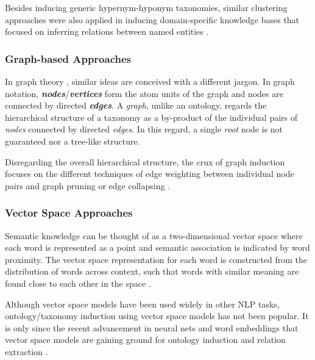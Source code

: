 Besides inducing generic hypernym-hyponym taxonomies, similar clustering approaches were also applied in inducing domain-specific knowledge bases that focused on inferring relations between named entities \citep[e.g.][]{hasegawa2004discovering}.


\subsubsection{Graph-based Approaches}

In graph theory \citep{biggs1976graph}, similar ideas are conceived with a different jargon. In graph notation, \emph{\textbf{nodes}}/\emph{\textbf{vertices}} form the atom units of the graph and nodes are connected by directed \emph{\textbf{edges}}. A \emph{graph}, unlike an ontology, regards the hierarchical structure of a taxonomy as a by-product of the individual pairs of \emph{nodes} connected by directed \emph{edges}. In this regard, a single \emph{root} node is not guaranteed nor a tree-like structure. 

Disregarding the overall hierarchical structure, the crux of graph induction focuses on the different techniques of edge weighting between individual node pairs and graph pruning or edge collapsing \citep{kozareva2010semi,navigliVF11,fountain2012taxonomy,Tuan2014}. 

\subsubsection{Vector Space Approaches}

Semantic knowledge can be thought of as a two-dimensional vector space where each word is represented as a point and semantic association is indicated by word proximity. The vector space representation for each word is constructed from the distribution of words across context, such that words with similar meaning are found close to each other in the space \citep{Mitchell:Lapata:2010,xling2013}.

Although vector space models have been used widely in other NLP tasks, ontology/taxonomy induction using vector space models has not been popular. It is only since the recent advancement in neural nets and word embeddings that vector space models are gaining ground for ontology induction and relation extraction \citep{saxe2013,khashabi2013}.

